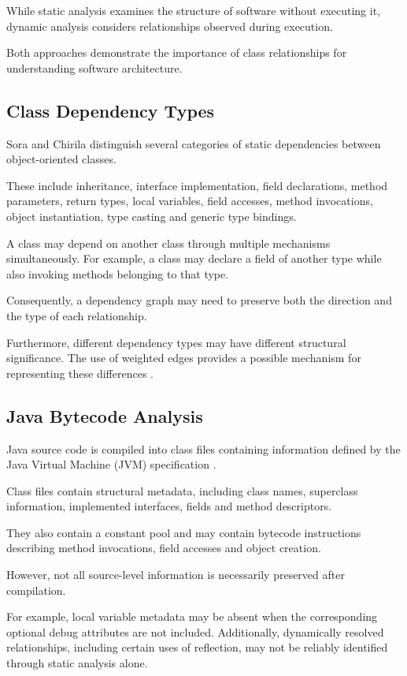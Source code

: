\documentclass[conference]{IEEEtran}
\begin{document}
	While static analysis examines the structure
	of software without executing it, dynamic
	analysis considers relationships observed
	during execution.
	
	Both approaches demonstrate the importance
	of class relationships for understanding
	software architecture.
	
	\subsection{Class Dependency Types}
	
	Sora and Chirila \cite{b1} distinguish
	several categories of static dependencies
	between object-oriented classes.
	
	These include inheritance, interface
	implementation, field declarations,
	method parameters, return types,
	local variables, field accesses,
	method invocations, object instantiation,
	type casting and generic type bindings.
	
	A class may depend on another class
	through multiple mechanisms simultaneously.
	For example, a class may declare a field
	of another type while also invoking
	methods belonging to that type.
	
	Consequently, a dependency graph may
	need to preserve both the direction
	and the type of each relationship.
	
	Furthermore, different dependency types
	may have different structural significance.
	The use of weighted edges provides a
	possible mechanism for representing
	these differences \cite{b1}.
	
	\subsection{Java Bytecode Analysis}
	
	Java source code is compiled into class
	files containing information defined
	by the Java Virtual Machine (JVM)
	specification \cite{b3}.
	
	Class files contain structural metadata,
	including class names, superclass
	information, implemented interfaces,
	fields and method descriptors.
	
	They also contain a constant pool
	and may contain bytecode instructions
	describing method invocations,
	field accesses and object creation.
	
	However, not all source-level information
	is necessarily preserved after compilation.
	
	For example, local variable metadata
	may be absent when the corresponding
	optional debug attributes are not included.
	Additionally, dynamically resolved
	relationships, including certain uses
	of reflection, may not be reliably
	identified through static analysis alone.
	
\end{document}
